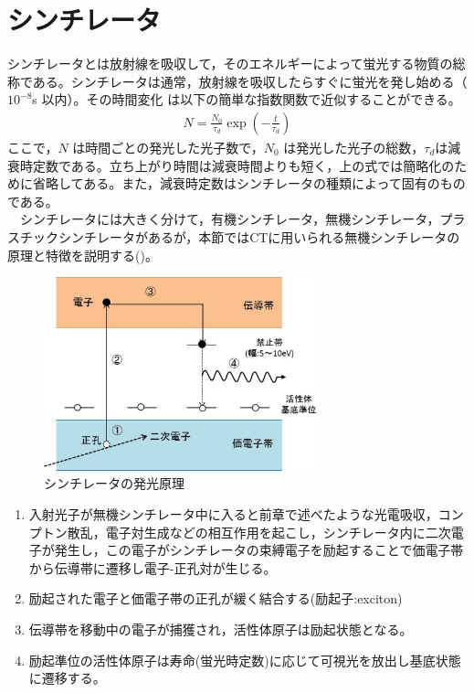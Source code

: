 \section{シンチレータ}
シンチレータとは放射線を吸収して，そのエネルギーによって蛍光する物質の総称である。シンチレータは通常，放射線を吸収したらすぐに蛍光を発し始める（$10^{-8}$s 以内）。その時間変化
は以下の簡単な指数関数で近似することができる。
\begin{align}
N=\frac{N_0}{\tau_d}\exp{\left(-\frac{t}{\tau_d}\right)}
\end{align}
ここで，$N$ は時間ごとの発光した光子数で，$N_0$ は発光した光子の総数，$\tau_d$は減衰時定数である。立ち上がり時間は減衰時間よりも短く，上の式では簡略化のために省略してある。また，減衰時定数はシンチレータの種類によって固有のものである。\\
\ \ シンチレータには大きく分けて，有機シンチレータ，無機シンチレータ，プラスチックシンチレータがあるが，本節ではCTに用いられる無機シンチレータの原理と特徴を説明する()。
\begin{figure}[H]
 \begin{center}
 \includegraphics[width=8cm]{image/other/sinci.eps}
 \end{center}
 \caption{シンチレータの発光原理\cite{QA}}
 \label{fig:sinti}
\end{figure}

\begin{enumerate}
\item 入射光子が無機シンチレータ中に入ると前章で述べたような光電吸収，コンプトン散乱，電子対生成などの相互作用を起こし，シンチレータ内に二次電子が発生し，この電子がシンチレータの束縛電子を励起することで価電子帯から伝導帯に遷移し電子-正孔対が生じる。
\item 励起された電子と価電子帯の正孔が緩く結合する(励起子:exciton)
\item 伝導帯を移動中の電子が捕獲され，活性体原子は励起状態となる。
\item 励起準位の活性体原子は寿命(蛍光時定数)に応じて可視光を放出し基底状態に遷移する。
\end{enumerate}

